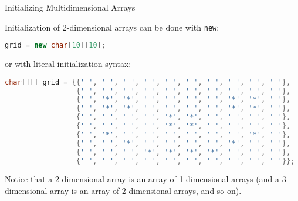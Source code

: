 \documentclass{beamer}
\begin{document}
\begin{frame}[fragile]{Initializing Multidimensional Arrays}


Initialization of 2-dimensional arrays can be done with {\tt new}:
\begin{lstlisting}[language=Java]
grid = new char[10][10];
\end{lstlisting}

or with literal initialization syntax:
\begin{lstlisting}[language=Java]
char[][] grid = {{' ', ' ', ' ', ' ', ' ', ' ', ' ', ' ', ' ', ' '},
                 {' ', ' ', ' ', ' ', ' ', ' ', ' ', ' ', ' ', ' '},
                 {' ', '*', '*', ' ', ' ', ' ', ' ', '*', '*', ' '},
                 {' ', '*', '*', ' ', ' ', ' ', ' ', '*', '*', ' '},
                 {' ', ' ', ' ', ' ', '*', '*', ' ', ' ', ' ', ' '},
                 {' ', ' ', ' ', ' ', '*', '*', ' ', ' ', ' ', ' '},
                 {' ', '*', ' ', ' ', ' ', ' ', ' ', ' ', '*', ' '},
                 {' ', ' ', '*', ' ', ' ', ' ', ' ', '*', ' ', ' '},
                 {' ', ' ', ' ', '*', '*', '*', '*', ' ', ' ', ' '},
                 {' ', ' ', ' ', ' ', ' ', ' ', ' ', ' ', ' ', ' '}};
\end{lstlisting}

Notice that a 2-dimensional array is an array of 1-dimensional arrays (and a 3-dimensional array is an array of 2-dimensional arrays, and so on).

\end{frame}
\end{document}
